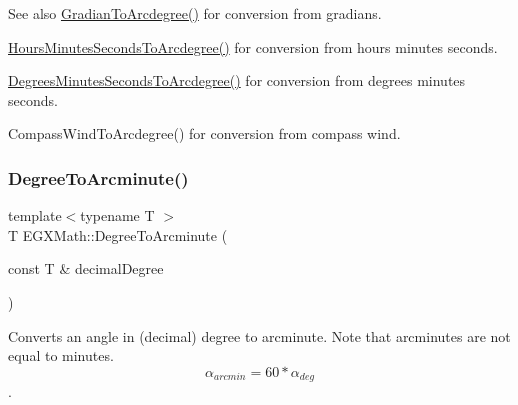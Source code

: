 \begin{DoxySeeAlso}{See also}
\mbox{\hyperlink{group___e_g_x_math-_conversions-_angle_conversions-_gradian_gacd0b1797f2460944dcbc541a855ec21c}{Gradian\+To\+Arcdegree()}} for conversion from gradians. 

\mbox{\hyperlink{group___e_g_x_math-_conversions-_angle_conversions-_hours_minutes_seconds_ga3c38143df47da88534ddbd13726748e2}{Hours\+Minutes\+Seconds\+To\+Arcdegree()}} for conversion from hours minutes seconds. 

\mbox{\hyperlink{group___e_g_x_math-_conversions-_angle_conversions-_degrees_minutes_seconds_ga71fd0a3b9238a3a4fde150802938dee8}{Degrees\+Minutes\+Seconds\+To\+Arcdegree()}} for conversion from degrees minutes seconds. 

Compass\+Wind\+To\+Arcdegree() for conversion from compass wind. 
\end{DoxySeeAlso}
\mbox{\label{group___e_g_x_math-_conversions-_angle_conversions-_degree_ga8abf327dc5f52907b2c881999e9cc43e}} 
\subsubsection{\texorpdfstring{Degree\+To\+Arcminute()}{DegreeToArcminute()}}
{\footnotesize\ttfamily template$<$typename T $>$ \\
T E\+G\+X\+Math\+::\+Degree\+To\+Arcminute (\begin{DoxyParamCaption}\item[{const T \&}]{decimal\+Degree }\end{DoxyParamCaption})}



Converts an angle in (decimal) degree to arcminute. Note that arcminutes are not equal to minutes. \[\alpha_{arcmin}= 60 * \alpha_{deg}\]. 

